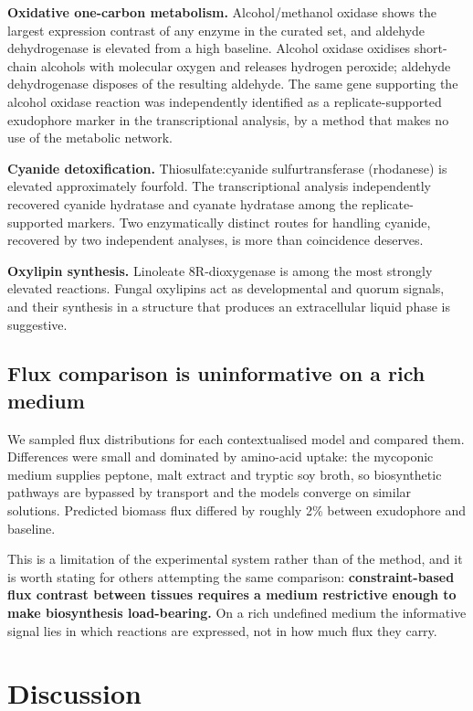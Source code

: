 \textbf{Oxidative one-carbon metabolism.} Alcohol/methanol oxidase shows the largest
expression contrast of any enzyme in the curated set, and aldehyde dehydrogenase is elevated
from a high baseline. Alcohol oxidase oxidises short-chain alcohols with molecular oxygen and
releases hydrogen peroxide; aldehyde dehydrogenase disposes of the resulting aldehyde. The
same gene supporting the alcohol oxidase reaction was independently identified as a
replicate-supported exudophore marker in the transcriptional analysis, by a method that makes
no use of the metabolic network.

\textbf{Cyanide detoxification.} Thiosulfate:cyanide sulfurtransferase (rhodanese) is elevated
approximately fourfold. The transcriptional analysis independently recovered cyanide hydratase
and cyanate hydratase among the replicate-supported markers. Two enzymatically distinct routes
for handling cyanide, recovered by two independent analyses, is more than coincidence deserves.

\textbf{Oxylipin synthesis.} Linoleate 8R-dioxygenase is among the most strongly elevated
reactions. Fungal oxylipins act as developmental and quorum signals, and their synthesis in a
structure that produces an extracellular liquid phase is suggestive.

\subsection{Flux comparison is uninformative on a rich medium}

We sampled flux distributions for each contextualised model and compared them. Differences
were small and dominated by amino-acid uptake: the mycoponic medium supplies peptone, malt
extract and tryptic soy broth, so biosynthetic pathways are bypassed by transport and the
models converge on similar solutions. Predicted biomass flux differed by roughly 2\% between
exudophore and baseline.

This is a limitation of the experimental system rather than of the method, and it is worth
stating for others attempting the same comparison: \textbf{constraint-based flux contrast
between tissues requires a medium restrictive enough to make biosynthesis load-bearing.} On a
rich undefined medium the informative signal lies in which reactions are expressed, not in how
much flux they carry.

\section{Discussion}

